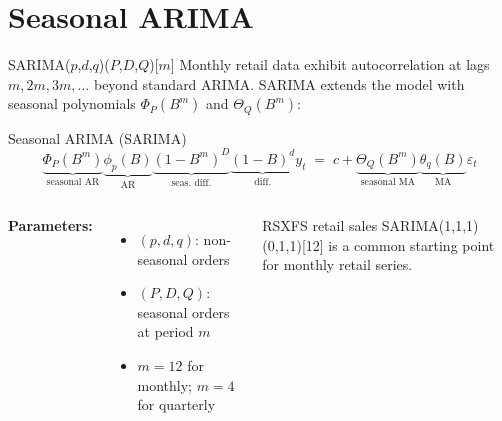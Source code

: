 \documentclass[aspectratio=169, 11pt]{beamer}
\begin{document}
\section{Seasonal ARIMA}


\begin{frame}{SARIMA($p$,$d$,$q$)($P$,$D$,$Q$)[$m$]}
  Monthly retail data exhibit autocorrelation at lags $m, 2m, 3m, \ldots$
  beyond standard ARIMA. SARIMA extends the model with seasonal polynomials
  $\Phi_P(B^m)$ and $\Theta_Q(B^m)$:
  \begin{definitionbox}{Seasonal ARIMA (SARIMA)}
    {\small
    \[
      \underbrace{\Phi_P(B^m)}_{\text{seasonal AR}}
      \underbrace{\phi_p(B)}_{\text{AR}}
      \underbrace{(1-B^m)^D}_{\text{seas.\ diff.}}
      \underbrace{(1-B)^d}_{\text{diff.}}
      y_t
      \;=\;
      c +
      \underbrace{\Theta_Q(B^m)}_{\text{seasonal MA}}
      \underbrace{\theta_q(B)}_{\text{MA}}
      \varepsilon_t
    \]
    }
  \end{definitionbox}
  \begin{columns}[T]
      \textbf{Parameters:}
      \begin{itemize}\small
        \item $(p,d,q)$: non-seasonal orders
        \item $(P,D,Q)$: seasonal orders at period $m$
        \item $m=12$ for monthly; $m=4$ for quarterly
      \end{itemize}
      \begin{examplebox}{RSXFS retail sales}
        {\small SARIMA(1,1,1)(0,1,1)[12]
        is a common starting point for monthly retail series.}
      \end{examplebox}
  \end{columns}
\end{frame}
\end{document}
